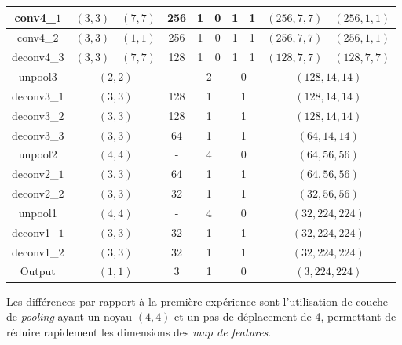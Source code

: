 \documentclass[a4paper, 11pt]{report}
\begin{document}
\begin{center}
\begin{tabular}{|c|c|c|c|c|c|c|c|c|c|c|}
\hline 
conv4\_$1$ & $(3,3)$ & $(7, 7)$ & \multicolumn{2}{c|}{256} & 1 & 0 & 1 & 1 & $(256, 7, 7)$ & $(256, 1, 1)$ \\
\hline
conv4\_$2$ & $(3,3)$ & $(1, 1)$ & \multicolumn{2}{c|}{256} & 1 & 0 & 1 & 1 & $(256, 7, 7)$ & $(256, 1, 1)$ \\
\hline
deconv4\_$3$ & $(3,3)$ & $(7, 7)$ & \multicolumn{2}{c|}{128} & 1 & 0 & 1 & 1 & $(128, 7, 7)$ & $(128, 7, 7)$ \\
\hline
unpool3 & \multicolumn{2}{c|}{$(2, 2)$} & \multicolumn{2}{c|}{-} & \multicolumn{2}{c|}{2} & \multicolumn{2}{c|}{0} & \multicolumn{2}{c|}{$(128, 14, 14)$}\\ 
\hline
deconv3\_$1$ & \multicolumn{2}{c|}{$(3, 3)$} & \multicolumn{2}{c|}{128} & \multicolumn{2}{c|}{1} & \multicolumn{2}{c|}{1} & \multicolumn{2}{c|}{$(128, 14, 14)$}\\ 
\hline
deconv3\_$2$ & \multicolumn{2}{c|}{$(3, 3)$} & \multicolumn{2}{c|}{128} & \multicolumn{2}{c|}{1} & \multicolumn{2}{c|}{1} & \multicolumn{2}{c|}{$(128, 14, 14)$}\\ 
\hline
deconv3\_$3$ & \multicolumn{2}{c|}{$(3, 3)$} & \multicolumn{2}{c|}{64} & \multicolumn{2}{c|}{1} & \multicolumn{2}{c|}{1} & \multicolumn{2}{c|}{$(64, 14, 14)$}\\ 
\hline
unpool2 & \multicolumn{2}{c|}{$(4, 4)$} & \multicolumn{2}{c|}{-} & \multicolumn{2}{c|}{4} & \multicolumn{2}{c|}{0} & \multicolumn{2}{c|}{$(64, 56, 56)$}\\ 
\hline
deconv2\_$1$ & \multicolumn{2}{c|}{$(3, 3)$} & \multicolumn{2}{c|}{64} & \multicolumn{2}{c|}{1} & \multicolumn{2}{c|}{1} & \multicolumn{2}{c|}{$(64, 56, 56)$}\\ 
\hline
deconv2\_$2$ & \multicolumn{2}{c|}{$(3, 3)$} & \multicolumn{2}{c|}{32} & \multicolumn{2}{c|}{1} & \multicolumn{2}{c|}{1} & \multicolumn{2}{c|}{$(32, 56, 56)$}\\ 
\hline
unpool1 & \multicolumn{2}{c|}{$(4, 4)$} & \multicolumn{2}{c|}{-} & \multicolumn{2}{c|}{4} & \multicolumn{2}{c|}{0} & \multicolumn{2}{c|}{$(32, 224, 224)$}\\ 
\hline
deconv1\_$1$ & \multicolumn{2}{c|}{$(3, 3)$} & \multicolumn{2}{c|}{32} & \multicolumn{2}{c|}{1} & \multicolumn{2}{c|}{1} & \multicolumn{2}{c|}{$(32, 224, 224)$}\\ 
\hline
deconv1\_$2$ & \multicolumn{2}{c|}{$(3, 3)$} & \multicolumn{2}{c|}{32} & \multicolumn{2}{c|}{1} & \multicolumn{2}{c|}{1} & \multicolumn{2}{c|}{$(32, 224, 224)$}\\ 
\hline
Output & \multicolumn{2}{c|}{$(1, 1)$} & \multicolumn{2}{c|}{3} & \multicolumn{2}{c|}{1} & \multicolumn{2}{c|}{0} & \multicolumn{2}{c|}{$(3, 224, 224)$}\\ 
\hline
\end{tabular} 
\end{center}
Les différences par rapport à la première expérience sont l'utilisation de couche de \emph{pooling} ayant un noyau $(4, 4)$ et un pas de déplacement de 4, permettant de réduire rapidement les dimensions des \emph{map de features}.
\end{document}
